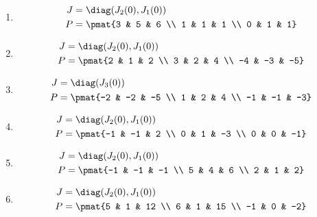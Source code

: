 \begin{enumerate}
\item

\begin{align*}
J &= \diag(J_{2}(0), J_{1}(0))\\
P &= \pmat{3 & 5 & 6 \\ 1 & 1 & 1 \\ 0 & 1 & 1}
\end{align*}

\item

\begin{align*}
J &= \diag(J_{2}(0), J_{1}(0))\\
P &= \pmat{2 & 1 & 2 \\ 3 & 2 & 4 \\ -4 & -3 & -5}
\end{align*}

\item

\begin{align*}
J &= \diag(J_{3}(0))\\
P &= \pmat{-2 & -2 & -5 \\ 1 & 2 & 4 \\ -1 & -1 & -3}
\end{align*}

\item

\begin{align*}
J &= \diag(J_{2}(0), J_{1}(0))\\
P &= \pmat{-1 & -1 & 2 \\ 0 & 1 & -3 \\ 0 & 0 & -1}
\end{align*}

\item

\begin{align*}
J &= \diag(J_{2}(0), J_{1}(0))\\
P &= \pmat{-1 & -1 & -1 \\ 5 & 4 & 6 \\ 2 & 1 & 2}
\end{align*}

\item

\begin{align*}
J &= \diag(J_{2}(0), J_{1}(0))\\
P &= \pmat{5 & 1 & 12 \\ 6 & 1 & 15 \\ -1 & 0 & -2}
\end{align*}


\end{enumerate}
